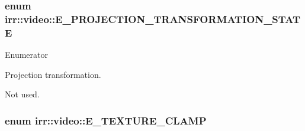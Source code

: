 \subsubsection[{\texorpdfstring{E\+\_\+\+P\+R\+O\+J\+E\+C\+T\+I\+O\+N\+\_\+\+T\+R\+A\+N\+S\+F\+O\+R\+M\+A\+T\+I\+O\+N\+\_\+\+S\+T\+A\+TE}{E\_PROJECTION\_TRANSFORMATION\_STATE}}]{\setlength{\rightskip}{0pt plus 5cm}enum {\bf irr\+::video\+::\+E\+\_\+\+P\+R\+O\+J\+E\+C\+T\+I\+O\+N\+\_\+\+T\+R\+A\+N\+S\+F\+O\+R\+M\+A\+T\+I\+O\+N\+\_\+\+S\+T\+A\+TE}}\hypertarget{namespaceirr_1_1video_a1336265bc542e3a3855f420565d889b6}{}\label{namespaceirr_1_1video_a1336265bc542e3a3855f420565d889b6}
\begin{Desc}
\item[Enumerator]\par
\begin{description}
\item[{\em 
E\+P\+T\+S\+\_\+\+P\+R\+OJ\hypertarget{namespaceirr_1_1video_a1336265bc542e3a3855f420565d889b6ae75f6a1cf441e3671a1c13be09972f1d}{}\label{namespaceirr_1_1video_a1336265bc542e3a3855f420565d889b6ae75f6a1cf441e3671a1c13be09972f1d}
}]Projection transformation. \item[{\em 
E\+P\+T\+S\+\_\+\+C\+O\+U\+NT\hypertarget{namespaceirr_1_1video_a1336265bc542e3a3855f420565d889b6af8d381c55dbad2f5e7bc58327b63a897}{}\label{namespaceirr_1_1video_a1336265bc542e3a3855f420565d889b6af8d381c55dbad2f5e7bc58327b63a897}
}]Not used. \end{description}
\end{Desc}
\subsubsection[{\texorpdfstring{E\+\_\+\+T\+E\+X\+T\+U\+R\+E\+\_\+\+C\+L\+A\+MP}{E\_TEXTURE\_CLAMP}}]{\setlength{\rightskip}{0pt plus 5cm}enum {\bf irr\+::video\+::\+E\+\_\+\+T\+E\+X\+T\+U\+R\+E\+\_\+\+C\+L\+A\+MP}}\hypertarget{namespaceirr_1_1video_a5d9933edc5ed7704a7a084f84b39811f}{}\label{namespaceirr_1_1video_a5d9933edc5ed7704a7a084f84b39811f}


